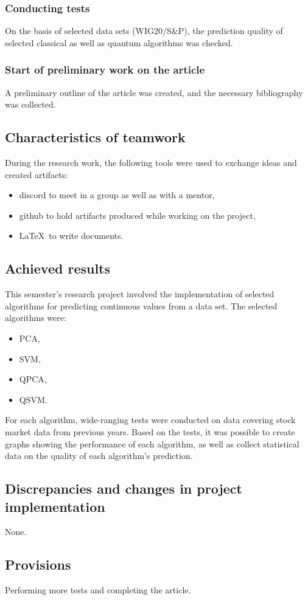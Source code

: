 \subsubsection{Conducting tests}
On the basis of selected data sets (WIG20/S\&P), the prediction quality of selected classical as well as quantum algorithms was checked.

\subsubsection{Start of preliminary work on the article}
A preliminary outline of the article was created, and the necessary bibliography was collected.

\subsection{Characteristics of teamwork}
During the research work, the following tools were used to exchange ideas and created artifacts:
\begin{itemize}
	\item discord to meet in a group as well as with a mentor, 
	\item github to hold artifacts produced while working on the project,
	\item \LaTeX ~to write documents.
\end{itemize}
\subsection{Achieved results}
This semester's research project involved the implementation of selected algorithms for predicting continuous values from a data set.
The selected algorithms were:
\begin{itemize}
	\item PCA,
	\item SVM,
	\item QPCA,
	\item QSVM.
\end{itemize}
For each algorithm, wide-ranging tests were conducted on data covering stock market data from previous years. 
Based on the tests, it was possible to create graphs showing the performance of each algorithm, as well as collect statistical data on the quality of each algorithm's prediction.
\subsection{Discrepancies and changes in project implementation}
None.
\subsection{Provisions}
Performing more tests and completing the article.

